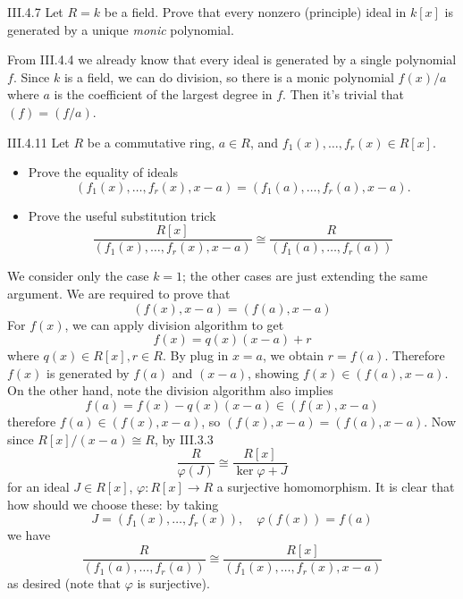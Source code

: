 \begin{problem}{III.4.7}
Let $R = k$ be a field. Prove that every nonzero (principle) ideal in $k[x]$ is generated by a unique \emph{monic} polynomial.
\end{problem}
\begin{pf}
From III.4.4 we already know that every ideal is generated by a single polynomial $f$. Since $k$ is a field, we can do division, so there is a monic polynomial $f(x)/a$ where $a$ is the coefficient of the largest degree in $f$. Then it's trivial that $(f) = (f/a)$.
\end{pf}

\begin{problem}{III.4.11}
Let $R$ be a commutative ring, $a \in R$, and $f_1(x),\dotsc,f_r(x) \in R[x]$.
\begin{itemize}
\setlength\itemsep{0pt}
\item Prove the equality of ideals
\[
(f_1(x),\dotsc,f_r(x),x-a) = (f_1(a),\dotsc,f_r(a),x-a).
\]
\item Prove the useful substitution trick
\[
\frac{R[x]}{(f_1(x),\dotsc,f_r(x),x-a)} \cong \frac{R}{(f_1(a),\dotsc,f_r(a))}
\]
\end{itemize}
\end{problem}
\begin{pf}
We consider only the case $k = 1$; the other cases are just extending the same argument. We are required to prove that 
\[
(f(x), x-a) = (f(a), x-a)
\]
For $f(x)$, we can apply division algorithm to get
\[
f(x) = q(x)(x-a) + r
\]
where $q(x) \in R[x], r \in R$. By plug in $x = a$, we obtain $r = f(a)$. Therefore $f(x)$ is generated by $f(a)$ and $(x-a)$, showing $f(x)\in (f(a), x-a)$. On the other hand, note the division algorithm also implies
\[
f(a) = f(x) - q(x)(x-a) \in (f(x), x-a)
\]
therefore $f(a) \in (f(x), x-a)$, so $(f(x), x-a) = (f(a), x-a)$. Now since $R[x]/(x-a) \cong R$, by III.3.3
\[
\frac{R}{\varphi(J)} \cong \frac{R[x]}{\ker \varphi + J}	
\]
for an ideal $J \in R[x]$, $\varphi : R[x] \to R$ a surjective homomorphism. It is clear that how should we choose these: by taking
\[
J = (f_1(x),\dotsc,f_r(x)), \quad \varphi(f(x)) = f(a)	
\]
we have
\[
\frac{R}{(f_1(a),\dotsc,f_r(a))} \cong \frac{R[x]}{(f_1(x),\dotsc,f_r(x),x-a)} 
\]
as desired (note that $\varphi$ is surjective).
\end{pf}

